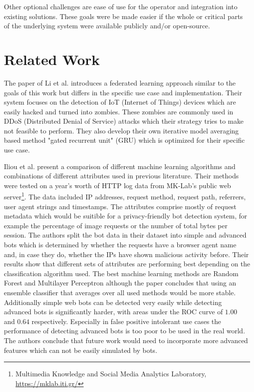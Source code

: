 \documentclass[
    fontsize=12pt,
    headings=small,
    parskip=half,           %
    bibliography=totoc,
    numbers=noenddot,       %
    open=any,               %
    final                   %
]{scrreprt}
\begin{document}
Other optional challenges are ease of use for the operator and integration into existing solutions. These goals were be made easier if the whole or critical parts of the underlying system were available publicly and/or open-source.

\section{Related Work}

The paper of Li et al. \cite{LiJi2021} introduces a federated learning approach similar to the goals of this work but differs in the specific use case and implementation. Their system focuses on the detection of IoT (Internet of Things) devices which are easily hacked and turned into zombies. These zombies are commonly used in DDoS (Distributed Denial of Service) attacks which their strategy tries to make not feasible to perform. They also develop their own iterative model averaging based method "gated recurrent unit" (GRU) which is optimized for their specific use case.

Iliou et al. \cite{10.1145/3339252.3339267} present a comparison of different machine learning algorithms and combinations of different attributes used in previous literature. Their methods were tested on a year's worth of HTTP log data from MK-Lab's public web server\footnote{Multimedia Knowledge and Social Media Analytics Laboratory, \url{https://mklab.iti.gr/}}. The data included IP addresses, request method, request path, referrers, user agent strings and timestamps. The attributes comprise mostly of request metadata which would be suitible for a privacy-friendly bot detection system, for example the percentage of image requests or the number of total bytes per session. The authors split the bot data in their dataset into simple and advanced bots which is determined by whether the requests have a browser agent name and, in case they do, whether the IPs have shown malicious activity before. Their results show that different sets of attributes are performing best depending on the classification algorithm used. The best machine learning methods are Random Forest and Multilayer Perceptron although the paper concludes that using an ensemble classifier that averages over all used methods would be more stable. Additionally simple web bots can be detected very easily while detecting advanced bots is significantly harder, with areas under the ROC curve of $1.00$ and $0.64$ respectively. Especially in false positive intolerant use cases the performance of detecting advanced bots is too poor to be used in the real world. The authors conclude that future work would need to incorporate more advanced features which can not be easily simulated by bots.
\end{document}
